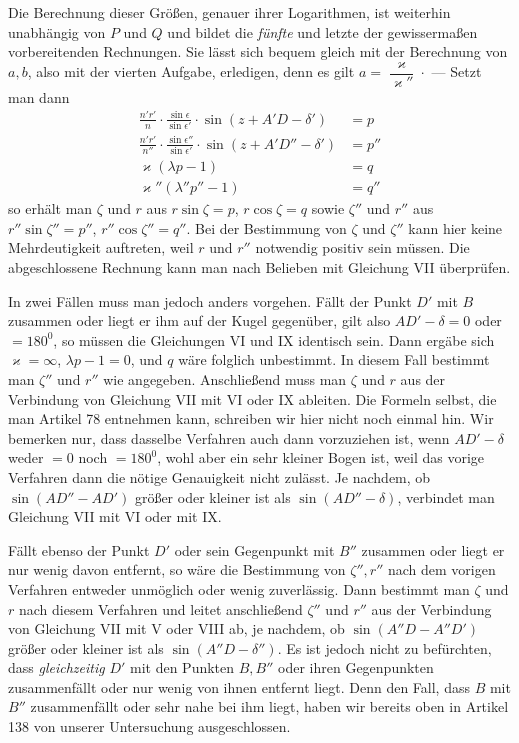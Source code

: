 Die Berechnung dieser Größen, genauer ihrer Logarithmen, ist weiterhin unabhängig von $P$ und $Q$ und bildet die \emph{fünfte} und letzte der gewissermaßen vorbereitenden Rechnungen. Sie lässt sich bequem gleich mit der Berechnung von $a,b$, also mit der vierten Aufgabe, erledigen, denn es gilt $a=\dfrac{\varkappa}{\varkappa''}\mathpunct{\cdot}$ — Setzt man dann
\[
\begin{aligned}
\frac{n'r'}{n}\cdot\frac{\sin\epsilon}{\sin\epsilon'}\cdot\sin(z+A'D-\delta')&=p\\[.5ex]
\frac{n'r'}{n''}\cdot\frac{\sin\epsilon''}{\sin\epsilon'}\cdot\sin(z+A'D''-\delta')&=p''\\[.5ex]
\varkappa(\lambda p-1)&=q\\[.5ex]
\varkappa''(\lambda''p''-1)&=q''
\end{aligned}
\]
so erhält man $\zeta$ und $r$ aus $r\sin\zeta=p$, $r\cos\zeta=q$ sowie $\zeta''$ und $r''$ aus $r''\sin\zeta''=p''$, $r''\cos\zeta''=q''$. Bei der Bestimmung von $\zeta$ und $\zeta''$ kann hier keine Mehrdeutigkeit auftreten, weil $r$ und $r''$ notwendig positiv sein müssen. Die abgeschlossene Rechnung kann man nach Belieben mit Gleichung VII überprüfen.

In zwei Fällen muss man jedoch anders vorgehen. Fällt der Punkt $D'$ mit $B$ zusammen oder liegt er ihm auf der Kugel gegenüber, gilt also $AD'-\delta=0$ oder $=180^0$, so müssen die Gleichungen VI und IX identisch sein. Dann ergäbe sich $\varkappa=\infty$, $\lambda p-1=0$, und $q$ wäre folglich unbestimmt. In diesem Fall bestimmt man $\zeta''$ und $r''$ wie angegeben. Anschließend muss man $\zeta$ und $r$ aus der Verbindung von Gleichung VII mit VI oder IX ableiten. Die Formeln selbst, die man Artikel 78 entnehmen kann, schreiben wir hier nicht noch einmal hin. Wir bemerken nur, dass dasselbe Verfahren auch dann vorzuziehen ist, wenn $AD'-\delta$ weder $=0$ noch $=180^0$, wohl aber ein sehr kleiner Bogen ist, weil das vorige Verfahren dann die nötige Genauigkeit nicht zulässt. Je nachdem, ob $\sin(AD''-AD')$ größer oder kleiner ist als $\sin(AD''-\delta)$, verbindet man Gleichung VII mit VI oder mit IX.

Fällt ebenso der Punkt $D'$ oder sein Gegenpunkt mit $B''$ zusammen oder liegt er nur wenig davon entfernt, so wäre die Bestimmung von $\zeta'',r''$ nach dem vorigen Verfahren entweder unmöglich oder wenig zuverlässig. Dann bestimmt man $\zeta$ und $r$ nach diesem Verfahren und leitet anschließend $\zeta''$ und $r''$ aus der Verbindung von Gleichung VII mit V oder VIII ab, je nachdem, ob $\sin(A''D-A''D')$ größer oder kleiner ist als $\sin(A''D-\delta'')$. Es ist jedoch nicht zu befürchten, dass \emph{gleichzeitig} $D'$ mit den Punkten $B,B''$ oder ihren Gegenpunkten zusammenfällt oder nur wenig von ihnen entfernt liegt. Denn den Fall, dass $B$ mit $B''$ zusammenfällt oder sehr nahe bei ihm liegt, haben wir bereits oben in Artikel 138 von unserer Untersuchung ausgeschlossen.
